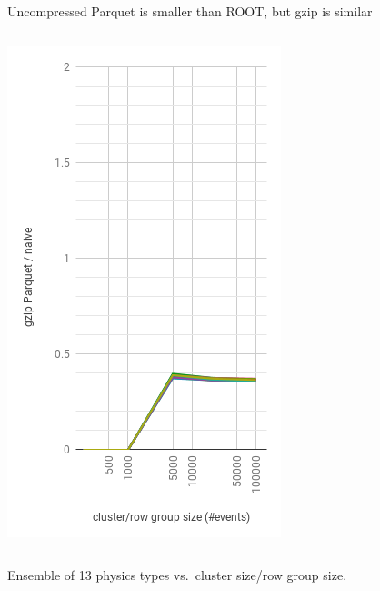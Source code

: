 \documentclass[aspectratio=169]{beamer}
\begin{document}
\begin{frame}{Uncompressed Parquet is smaller than ROOT, but gzip is similar}
\begin{columns}
\begin{center}
\includegraphics[width=\linewidth]{parquet-gzip.png}
\end{center}
\end{columns}

\vspace{0.25 cm}
Ensemble of 13 physics types vs.\ cluster size/row group size.
\end{frame}
\end{document}
